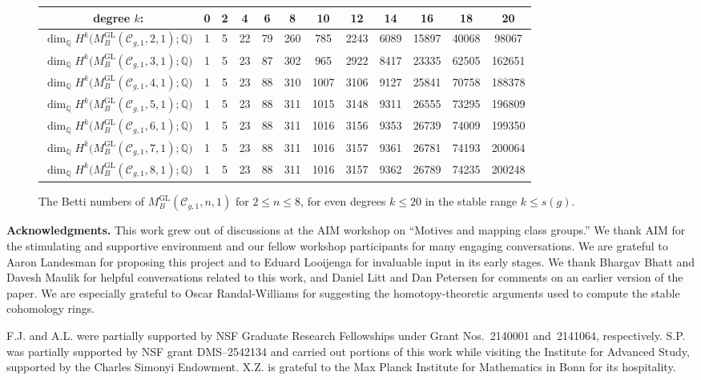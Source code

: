 \documentclass[11pt,reqno]{amsart}
\theoremstyle{plain} %
\theoremstyle{definition}
\newcommand{\QQ}{\mathbb{Q}}
\newcommand{\C}{\mathcal{C}}
\DeclareMathOperator{\GL}{GL}
\begin{document}
\begin{figure}[ht!]
\renewcommand{\arraystretch}{1.35}
\setlength{\tabcolsep}{3.5pt}
	\begin{tabular}{|c|c|c|c|c|c|c|c|c|c|c|c|}
		\hline
		degree $k$: & 0 & 2 & 4 & 6 & 8 & 10 & 12 & 14 & 16 & 18 & 20 \\
		\hline
		$\dim_\QQ H^{k}\big(M_B^{\GL}(\C_{g,1},2,1); \QQ\big)$ & 1 & 5 & 22 & 79 & 260 & 785 & 2243 & 6089 & 15897 & 40068 & 98067 \\
		$\dim_\QQ H^{k}\big(M_B^{\GL}(\C_{g,1},3,1); \QQ\big)$ & 1 & 5 & 23 & 87 & 302 & 965 & 2922 & 8417 & 23335 & 62505 & 162651 \\
		$\dim_\QQ H^{k}\big(M_B^{\GL}(\C_{g,1},4,1); \QQ\big)$ & 1 & 5 & 23 & 88 & 310 & 1007 & 3106 & 9127 & 25841 & 70758 & 188378 \\
		$\dim_\QQ H^{k}\big(M_B^{\GL}(\C_{g,1},5,1); \QQ\big)$ & 1 & 5 & 23 & 88 & 311 & 1015 & 3148 & 9311 & 26555 & 73295 & 196809 \\
		$\dim_\QQ H^{k}\big(M_B^{\GL}(\C_{g,1},6,1); \QQ\big)$ & 1 & 5 & 23 & 88 & 311 & 1016 & 3156 & 9353 & 26739 & 74009 & 199350 \\
		$\dim_\QQ H^{k}\big(M_B^{\GL}(\C_{g,1},7,1); \QQ\big)$ & 1 & 5 & 23 & 88 & 311 & 1016 & 3157 & 9361 & 26781 & 74193 & 200064 \\
		$\dim_\QQ H^{k}\big(M_B^{\GL}(\C_{g,1},8,1); \QQ\big)$ & 1 & 5 & 23 & 88 & 311 & 1016 & 3157 & 9362 & 26789 & 74235 & 200248 \\
		\hline
	\end{tabular}
	\caption{The Betti numbers of $M_B^{\GL}(\C_{g,1},n,1)$ for $2 \leq n \leq 8$, for even degrees $k \leq 20$ in the stable range $k \leq s(g)$.}
	\label{fig:table-gl}
\end{figure}

\noindent\textbf{Acknowledgments.} This work grew out of discussions at the AIM workshop on ``Motives and mapping class groups.'' We thank AIM for the stimulating and supportive environment and our fellow workshop participants for many engaging conversations. We are grateful to Aaron Landesman for proposing this project and to Eduard Looijenga for invaluable input in its early stages. We thank Bhargav Bhatt and Davesh Maulik for helpful conversations related to this work, and Daniel Litt and Dan Petersen for comments on an earlier version of the paper. We are especially grateful to Oscar Randal-Williams for suggesting the homotopy-theoretic arguments used to compute the stable cohomology rings.

F.J. and A.L. were partially supported by NSF Graduate Research Fellowships under Grant Nos.~2140001 and~2141064, respectively. S.P. was partially supported by NSF grant DMS--2542134 and carried out portions of this work while visiting the Institute for Advanced Study, supported by the Charles Simonyi Endowment. X.Z. is grateful to the Max Planck Institute for Mathematics in Bonn for its hospitality.
\end{document}
